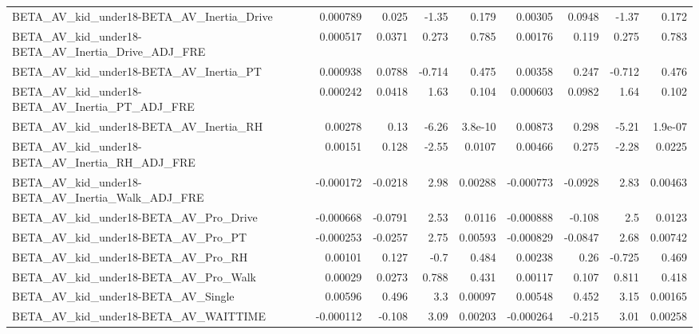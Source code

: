 \begin{tabular}{lrrrrrrrr}
BETA\_AV\_kid\_under18-BETA\_AV\_Inertia\_Drive          &    0.000789 &        0.025 &    -1.35 &    0.179 &    0.00305 &      0.0948 &        -1.37 &         0.172 \\
BETA\_AV\_kid\_under18-BETA\_AV\_Inertia\_Drive\_ADJ\_FRE  &    0.000517 &       0.0371 &    0.273 &    0.785 &    0.00176 &       0.119 &        0.275 &         0.783 \\
BETA\_AV\_kid\_under18-BETA\_AV\_Inertia\_PT             &    0.000938 &       0.0788 &   -0.714 &    0.475 &    0.00358 &       0.247 &       -0.712 &         0.476 \\
BETA\_AV\_kid\_under18-BETA\_AV\_Inertia\_PT\_ADJ\_FRE     &    0.000242 &       0.0418 &     1.63 &    0.104 &   0.000603 &      0.0982 &         1.64 &         0.102 \\
BETA\_AV\_kid\_under18-BETA\_AV\_Inertia\_RH             &     0.00278 &         0.13 &    -6.26 &  3.8e-10 &    0.00873 &       0.298 &        -5.21 &       1.9e-07 \\
BETA\_AV\_kid\_under18-BETA\_AV\_Inertia\_RH\_ADJ\_FRE     &     0.00151 &        0.128 &    -2.55 &   0.0107 &    0.00466 &       0.275 &        -2.28 &        0.0225 \\
BETA\_AV\_kid\_under18-BETA\_AV\_Inertia\_Walk\_ADJ\_FRE   &   -0.000172 &      -0.0218 &     2.98 &  0.00288 &  -0.000773 &     -0.0928 &         2.83 &       0.00463 \\
BETA\_AV\_kid\_under18-BETA\_AV\_Pro\_Drive              &   -0.000668 &      -0.0791 &     2.53 &   0.0116 &  -0.000888 &      -0.108 &          2.5 &        0.0123 \\
BETA\_AV\_kid\_under18-BETA\_AV\_Pro\_PT                 &   -0.000253 &      -0.0257 &     2.75 &  0.00593 &  -0.000829 &     -0.0847 &         2.68 &       0.00742 \\
BETA\_AV\_kid\_under18-BETA\_AV\_Pro\_RH                 &     0.00101 &        0.127 &     -0.7 &    0.484 &    0.00238 &        0.26 &       -0.725 &         0.469 \\
BETA\_AV\_kid\_under18-BETA\_AV\_Pro\_Walk               &     0.00029 &       0.0273 &    0.788 &    0.431 &    0.00117 &       0.107 &        0.811 &         0.418 \\
BETA\_AV\_kid\_under18-BETA\_AV\_Single                 &     0.00596 &        0.496 &      3.3 &  0.00097 &    0.00548 &       0.452 &         3.15 &       0.00165 \\
BETA\_AV\_kid\_under18-BETA\_AV\_WAITTIME               &   -0.000112 &       -0.108 &     3.09 &  0.00203 &  -0.000264 &      -0.215 &         3.01 &       0.00258 \\

\end{tabular}
